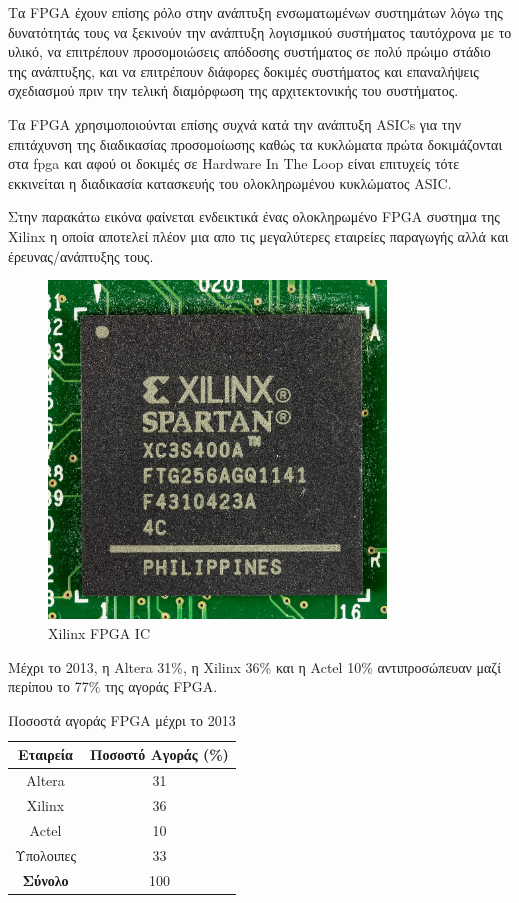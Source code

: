 Τα FPGA έχουν επίσης ρόλο στην ανάπτυξη ενσωματωμένων συστημάτων λόγω της δυνατότητάς τους να ξεκινούν την ανάπτυξη λογισμικού συστήματος ταυτόχρονα με το υλικό, 
να επιτρέπουν προσομοιώσεις απόδοσης συστήματος σε πολύ πρώιμο στάδιο της ανάπτυξης, και να επιτρέπουν διάφορες δοκιμές συστήματος και επαναλήψεις σχεδιασμού 
πριν την τελική διαμόρφωση της αρχιτεκτονικής του συστήματος.

Τα FPGA χρησιμοποιούνται επίσης συχνά κατά την ανάπτυξη ASICs για την επιτάχυνση της διαδικασίας προσομοίωσης καθώς τα κυκλώματα πρώτα δοκιμάζονται στα fpga και αφού 
οι δοκιμές σε Hardware In The Loop είναι επιτυχείς τότε εκκινείται η διαδικασία κατασκευής του ολοκληρωμένου κυκλώματος ASIC. 

Στην παρακάτω εικόνα φαίνεται ενδεικτικά ένας ολοκληρωμένο FPGA συστημα της Xilinx η οποία αποτελεί πλέον μια απο τις μεγαλύτερες εταιρείες παραγωγής αλλά
και έρευνας/ανάπτυξης τους.

\begin{figure}[h!]
  \centering
  \includegraphics[width=0.8\textwidth]{figures/chapter3/xilinx_fpga.png}
  \caption{Xilinx FPGA IC}
  \label{fig:xilinx_fpga}
\end{figure}

Μέχρι το 2013, η Altera 31\%, η Xilinx 36\% και η Actel 10\% αντιπροσώπευαν μαζί περίπου το 77\% της αγοράς FPGA.
\begin{table}[h!]
  \centering
  \begin{tabular}{|c|c|}
    \hline
    \textbf{Εταιρεία} & \textbf{Ποσοστό Αγοράς (\%)} \\
    \hline
    Altera & 31 \\
    Xilinx & 36 \\
    Actel & 10 \\
    Υπολοιπες & 33 \\
    \hline
    \textbf{Σύνολο} & 100 \\
    \hline
  \end{tabular}
  \caption{Ποσοστά αγοράς FPGA μέχρι το 2013}
  \label{tab:fpga_market_share}
\end{table}

